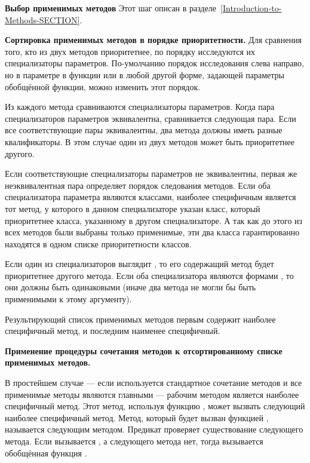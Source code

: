 \textbf{Выбор применимых методов}
Этот шаг описан в разделе~\ref{Introduction-to-Methods-SECTION}.

\textbf{Сортировка применимых методов в порядке приоритетности.}
Для сравнения того, кто из двух методов приоритетнее, по порядку
исследуются их специализаторы параметров. По-умолчанию порядок исследования
слева направо, но в параметре  в функции
 или в любой другой форме, задающей параметры обобщённой
функции, можно изменить этот порядок.

Из каждого метода сравниваются специализаторы параметров. Когда пара
специализаторов параметров эквивалентна, сравнивается следующая пара. Если все
соответствующие пары эквивалентны, два метода должны иметь разные
квалификаторы. В этом случае один из двух методов может быть приоритетнее другого.

Если соответствующие специализаторы параметров не эквивалентны, первая же
неэквивалентная пара определяет порядок следования методов. Если оба
специализатора параметра являются классами, наиболее специфичным является тот
метод, у которого в данном специализаторе указан класс, который приоритетнее
класса, указанному в другом специализаторе. А так как до этого из всех методов
были выбраны только применимые, эти два класса гарантированно находятся в одном
списке приоритетности классов.

Если один из специализаторов выглядит , то его
содержащий метод будет приоритетнее другого метода. Если оба специализатора
являются формами , то они должны быть одинаковыми (иначе два метода не
могли бы быть применимыми к этому аргументу).

Результирующий список применимых методов первым содержит наиболее специфичный
метод, и последним наименее специфичный.

\textbf{Применение процедуры сочетания методов к отсортированному списке
  применимых методов.}

В простейшем случае --- если используется стандартное сочетание методов и все
применимые методы являются главными --- рабочим методом является наиболее
специфичный метод. Этот метод, используя функцию , может
вызвать следующий наиболее специфичный метод. Метод, который будет вызван
функцией , называется следующим методом. Предикат
 проверяет существование следующего метода. Если
вызывается , а следующего метода нет, тогда вызывается
обобщённая функция .

